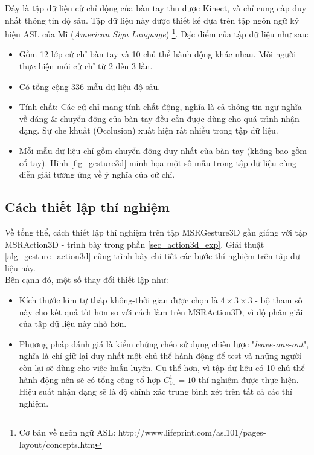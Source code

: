 Đây là tập dữ liệu cử chỉ động của bàn tay thu được Kinect, và chỉ cung cấp duy nhất thông tin độ sâu. Tập dữ liệu này được thiết kế dựa trên tập ngôn ngữ ký hiệu ASL của Mĩ (\textit{American Sign Language}) \footnote{Cơ bản về ngôn ngữ ASL: http://www.lifeprint.com/asl101/pages-layout/concepts.htm}. Đặc điểm của tập dữ liệu như sau: 
\begin{itemize}
\item Gồm 12 lớp cử chỉ bàn tay và 10 chủ thể hành động khác nhau. Mỗi người thực hiện mỗi cử chỉ từ 2 đến 3 lần.
\item Có tổng cộng 336 mẫu dữ liệu độ sâu. %
\item Tính chất: Các cử chỉ mang tính chất động, nghĩa là cả thông tin ngữ nghĩa về dáng \& chuyển động của bàn tay đều cần được dùng cho quá trình nhận dạng. Sự che khuất (Occlusion) xuất hiện rất nhiều trong tập dữ liệu.
\item Mỗi mẫu dữ liệu chỉ gồm chuyển động duy nhất của bàn tay (không bao gồm cổ tay). Hình \ref{fig_gesture3d} minh họa một số mẫu trong tập dữ liệu cùng diễn giải tương ứng về ý nghĩa của cử chỉ. 
\end{itemize}

\subsection{Cách thiết lập thí nghiệm}
Về tổng thể, cách thiết lập thí nghiệm trên tập MSRGesture3D gần giống với tập MSRAction3D - trình bày trong phần \ref{sec_action3d_exp}. Giải thuật \ref{alg_gesture_action3d} cũng trình bày chi tiết các bước thí nghiệm trên tập dữ liệu này.\\
Bên cạnh đó, một số thay đổi thiết lập như:
\begin{itemize}
\item Kích thước kim tự tháp không-thời gian được chọn là $4 \times 3 \times 3$ - bộ tham số này cho kết quả tốt hơn so với cách làm trên MSRAction3D, vì độ phân giải của tập dữ liệu này nhỏ hơn. 
\item Phương pháp đánh giá là kiểm chứng chéo sử dụng chiến lược "\textit{leave-one-out}", nghĩa là chỉ giữ lại duy nhất một chủ thể hành động để test và những người còn lại sẽ dùng cho việc huấn luyện. Cụ thể hơn, vì tập dữ liệu có 10 chủ thể hành động nên sẽ có tổng cộng tổ hợp $C_{10}^1 = 10$ thí nghiệm được thực hiện. Hiệu suất nhận dạng sẽ là độ chính xác trung bình xét trên tất cả các thí nghiệm. 
\end{itemize} 

